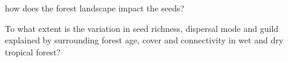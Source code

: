 

how does the forest landscape impact the seeds?

To what extent is the variation in seed richness, dispersal mode and guild explained by surrounding forest age, cover and connectivity in wet and dry tropical forest?